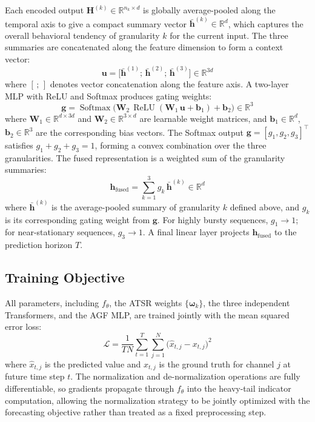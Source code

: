 \documentclass[journal]{IEEEtran}
\begin{document}
Each encoded output $\mathbf{H}^{(k)} \in \mathbb{R}^{n_k \times d}$ is
globally average-pooled along the temporal axis to give a compact summary
vector $\bar{\mathbf{h}}^{(k)} \in \mathbb{R}^d$, which captures the
overall behavioral tendency of granularity $k$ for the current input.
The three summaries are concatenated along the feature dimension to form a
context vector:
\begin{equation}
\mathbf{u} = \bigl[\bar{\mathbf{h}}^{(1)};\, \bar{\mathbf{h}}^{(2)};\,
  \bar{\mathbf{h}}^{(3)}\bigr] \in \mathbb{R}^{3d}
\label{eq:context}
\end{equation}
where $[\,;\,]$ denotes vector concatenation along the feature axis.
A two-layer MLP with ReLU and Softmax produces gating weights:
\begin{equation}
\mathbf{g} = \operatorname{Softmax}\bigl(
  \mathbf{W}_2\,\operatorname{ReLU}(\mathbf{W}_1\,\mathbf{u} + \mathbf{b}_1)
  + \mathbf{b}_2\bigr) \in \mathbb{R}^3
\label{eq:gate}
\end{equation}
where $\mathbf{W}_1 \in \mathbb{R}^{d \times 3d}$ and
$\mathbf{W}_2 \in \mathbb{R}^{3 \times d}$ are learnable weight matrices,
and $\mathbf{b}_1 \in \mathbb{R}^{d}$, $\mathbf{b}_2 \in \mathbb{R}^{3}$
are the corresponding bias vectors.
The Softmax output $\mathbf{g} = [g_1, g_2, g_3]^\top$ satisfies
$g_1 + g_2 + g_3 = 1$, forming a convex combination over the three
granularities.
The fused representation is a weighted sum of the granularity summaries:
\begin{equation}
\mathbf{h}_\text{fused} = \sum_{k=1}^{3} g_k\, \bar{\mathbf{h}}^{(k)}
  \in \mathbb{R}^d
\label{eq:fused}
\end{equation}
where $\bar{\mathbf{h}}^{(k)}$ is the average-pooled summary of granularity
$k$ defined above, and $g_k$ is its corresponding gating weight from
$\mathbf{g}$.
For highly bursty sequences, $g_1 \to 1$; for near-stationary sequences,
$g_3 \to 1$.
A final linear layer projects $\mathbf{h}_\text{fused}$ to the prediction
horizon $T$.

\subsection{Training Objective}

All parameters, including $f_\theta$, the ATSR weights
$\{\boldsymbol{\omega}_k\}$, the three independent Transformers, and the AGF
MLP, are trained jointly with the mean squared error loss:
\begin{equation}
\mathcal{L} = \frac{1}{TN}
  \sum_{t=1}^{T}\sum_{j=1}^{N}\bigl(\hat{x}_{t,j} - x_{t,j}\bigr)^2
\label{eq:loss}
\end{equation}
where $\hat{x}_{t,j}$ is the predicted value and $x_{t,j}$ is the ground
truth for channel $j$ at future time step $t$.
The normalization and de-normalization operations are fully differentiable,
so gradients propagate through $f_\theta$ into the heavy-tail indicator
computation, allowing the normalization strategy to be jointly optimized
with the forecasting objective rather than treated as a fixed preprocessing
step.
\end{document}
